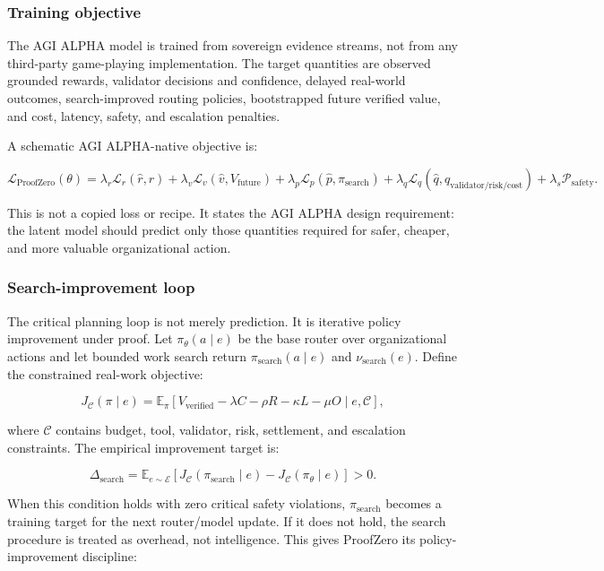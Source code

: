 \documentclass[11pt]{article}
\begin{document}
\subsubsection{Training objective}\label{training-objective}

The AGI ALPHA model is trained from sovereign evidence streams, not from any third-party game-playing implementation. The target quantities are observed grounded rewards, validator decisions and confidence, delayed real-world outcomes, search-improved routing policies, bootstrapped future verified value, and cost, latency, safety, and escalation penalties.

A schematic AGI ALPHA-native objective is:

\[
\mathcal{L}_{\mathrm{ProofZero}}(\theta)=
\lambda_r\mathcal{L}_r(\hat r,r)
+\lambda_v\mathcal{L}_v(\hat v,V_{\mathrm{future}})
+\lambda_p\mathcal{L}_p(\hat p,\pi_{\mathrm{search}})
+\lambda_q\mathcal{L}_q(\hat q,q_{\mathrm{validator/risk/cost}})
+\lambda_s\mathcal{P}_{\mathrm{safety}}.
\]

This is not a copied loss or recipe. It states the AGI ALPHA design requirement: the latent model should predict only those quantities required for safer, cheaper, and more valuable organizational action.

\subsubsection{Search-improvement loop}\label{search-improvement-loop}

The critical planning loop is not merely prediction. It is iterative policy improvement under proof. Let \(\pi_\theta(a\mid e)\) be the base router over organizational actions and let bounded work search return \(\pi_{\mathrm{search}}(a\mid e)\) and \(\nu_{\mathrm{search}}(e)\). Define the constrained real-work objective:

\[
J_{\mathcal{C}}(\pi\mid e)=\mathbb{E}_{\pi}\left[V_{\mathrm{verified}}-\lambda C-\rho R-\kappa L-\mu O\mid e,\mathcal{C}\right],
\]

where \(\mathcal{C}\) contains budget, tool, validator, risk, settlement, and escalation constraints. The empirical improvement target is:

\[
\Delta_{\mathrm{search}} = \mathbb{E}_{e\sim \mathcal{E}}\left[J_{\mathcal{C}}(\pi_{\mathrm{search}}\mid e)-J_{\mathcal{C}}(\pi_\theta\mid e)\right] > 0.
\]

When this condition holds with zero critical safety violations, \(\pi_{\mathrm{search}}\) becomes a training target for the next router/model update. If it does not hold, the search procedure is treated as overhead, not intelligence. This gives ProofZero its policy-improvement discipline:
\end{document}
